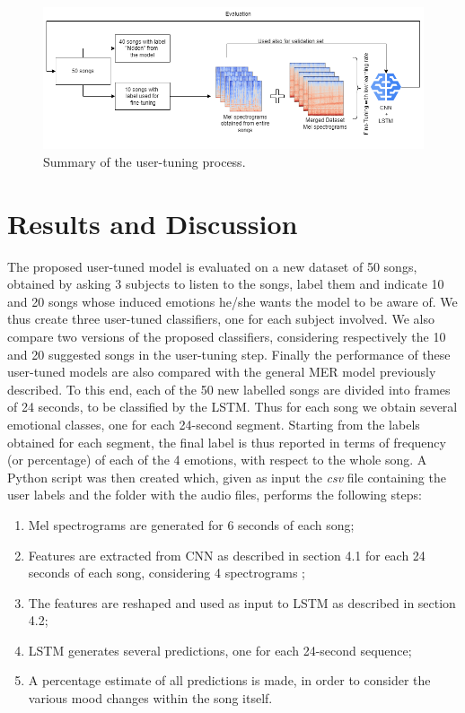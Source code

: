 \documentclass[runningheads]{llncs}
\begin{document}
\begin{figure}
\centering
\includegraphics[scale = 0.45]{img/finetuning-process.png}
\caption{Summary of the user-tuning process.}
\label{fig-finetuning-process}
\end{figure}

\section{Results and Discussion}

The proposed user-tuned model is evaluated on a new dataset of 50 songs, obtained by asking 3 subjects to listen to the songs, label them and indicate 10 and 20 songs whose induced emotions he/she wants the model to be aware of. 
We thus create three user-tuned classifiers, one for each subject involved. 
We also compare two versions of the proposed classifiers, considering respectively the 10 and 20 suggested songs in the user-tuning step. 
Finally the performance of these user-tuned models are also compared with the general MER model previously described. 
To this end, each of the 50 new labelled songs are divided into frames of 24 seconds, to be classified by the LSTM. Thus for each song we obtain several emotional classes, one for each 24-second segment. Starting from the labels obtained for each segment, the final label is thus reported in terms of frequency (or percentage) of each of the 4 emotions, with respect to the whole song.      
A Python script was then created which, given as input the \textit{csv} file containing the user labels and the folder with the audio files, performs the following steps:
\begin{enumerate}
    \item Mel spectrograms are generated for 6 seconds of each song;
    \item Features are extracted from CNN as described in section 4.1 for each 24 seconds of each song, considering 4 spectrograms ;
    \item The features are reshaped and used as input to LSTM as described in section 4.2;
    \item LSTM generates several predictions, one for each 24-second sequence;
    \item A percentage estimate of all predictions is made, in order to consider the various mood changes within the song itself.
\end{enumerate}
\end{document}
